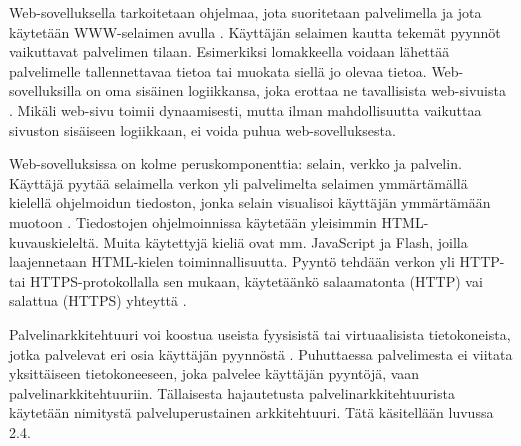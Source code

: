 Web-sovelluksella tarkoitetaan ohjelmaa, jota suoritetaan palvelimella ja jota käytetään WWW-selaimen avulla \cite{uml}. Käyttäjän selaimen kautta tekemät pyynnöt vaikuttavat palvelimen tilaan. Esimerkiksi lomakkeella voidaan lähettää palvelimelle tallennettavaa tietoa tai muokata siellä jo olevaa tietoa. Web-sovelluksilla on oma sisäinen logiikkansa, joka erottaa ne tavallisista web-sivuista \cite{uml}. Mikäli web-sivu toimii dynaamisesti, mutta ilman mahdollisuutta vaikuttaa sivuston sisäiseen logiikkaan, ei voida puhua web-sovelluksesta.

Web-sovelluksissa on kolme peruskomponenttia: selain, verkko ja palvelin. Käyttäjä pyytää selaimella verkon yli palvelimelta selaimen ymmärtämällä kielellä ohjelmoidun tiedoston, jonka selain visualisoi käyttäjän ymmärtämään muotoon \cite{uml}. Tiedostojen ohjelmoinnissa käytetään yleisimmin HTML-kuvauskieleltä. Muita käytettyjä kieliä ovat mm. JavaScript ja Flash, joilla laajennetaan HTML-kielen toiminnallisuutta. Pyyntö tehdään verkon yli HTTP- tai HTTPS-protokollalla sen mukaan, käytetäänkö salaamatonta (HTTP) vai salattua (HTTPS) yhteyttä \cite{rfc2818}.

Palvelinarkkitehtuuri voi koostua useista fyysisistä tai virtuaalisista tietokoneista, jotka palvelevat eri osia käyttäjän pyynnöstä \cite{soa}. Puhuttaessa palvelimesta ei viitata yksittäiseen tietokoneeseen, joka palvelee käyttäjän pyyntöjä, vaan pal\-ve\-lin\-ark\-ki\-teh\-tuu\-riin. Tällaisesta hajautetusta palvelinarkkitehtuurista käytetään nimitystä palveluperustainen arkkitehtuuri. Tätä käsitellään luvussa 2.4.